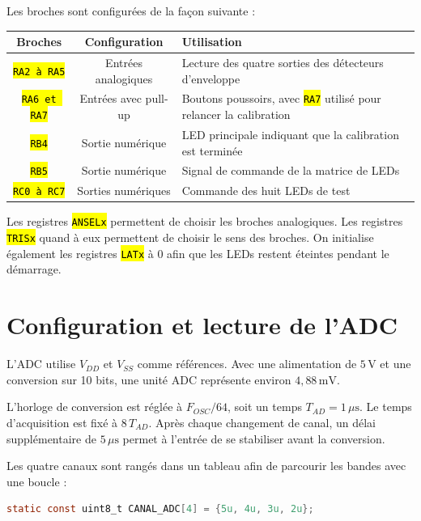 \documentclass{report}
\let\OldTexttt\texttt
\renewcommand{\texttt}[1]{\OldTexttt{\hl{#1}}}
\begin{document}
Les broches sont configurées de la façon suivante :

\begin{center}
\begin{tabular}{|c|c|p{7.5cm}|}
\hline
\textbf{Broches} & \textbf{Configuration} & \textbf{Utilisation} \\
\hline
\texttt{RA2 à RA5} & Entrées analogiques & Lecture des quatre sorties des détecteurs d'enveloppe \\
\hline
\texttt{RA6 et RA7} & Entrées avec pull-up & Boutons poussoirs, avec \texttt{RA7} utilisé pour relancer la calibration \\
\hline
\texttt{RB4} & Sortie numérique & LED principale indiquant que la calibration est terminée \\
\hline
\texttt{RB5} & Sortie numérique & Signal de commande de la matrice de LEDs \\
\hline
\texttt{RC0 à RC7} & Sorties numériques & Commande des huit LEDs de test \\
\hline
\end{tabular}
\end{center}

Les registres \texttt{ANSELx} permettent de choisir les broches analogiques. Les registres \texttt{TRISx} quand à eux permettent de choisir le sens des broches. On initialise également les registres \texttt{LATx} à 0 afin que les LEDs restent éteintes pendant le démarrage.


\section{Configuration et lecture de l'ADC}

L'ADC utilise \(V_{DD}\) et \(V_{SS}\) comme références. Avec une alimentation
de \(5\,\mathrm{V}\) et une conversion sur 10 bits, une unité ADC représente
environ \(4{,}88\,\mathrm{mV}\).

L'horloge de conversion est réglée à \(F_{OSC}/64\), soit un temps
\(T_{AD}=1\,\mu\mathrm{s}\). Le temps d'acquisition est fixé à
\(8\,T_{AD}\). Après chaque changement de canal, un délai supplémentaire de
\(5\,\mu\mathrm{s}\) permet à l'entrée de se stabiliser avant la conversion.

Les quatre canaux sont rangés dans un tableau afin de parcourir les bandes
avec une boucle :

\begin{lstlisting}[language=C]
static const uint8_t CANAL_ADC[4] = {5u, 4u, 3u, 2u};
\end{lstlisting}
\end{document}
